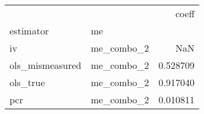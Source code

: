 \begin{tabular}{llr}
\toprule
    &            &     coeff \\
estimator & me &           \\
\midrule
iv & me\_combo\_2 &       NaN \\
ols\_mismeasured & me\_combo\_2 &  0.528709 \\
ols\_true & me\_combo\_2 &  0.917040 \\
pcr & me\_combo\_2 &  0.010811 \\
\bottomrule
\end{tabular}
